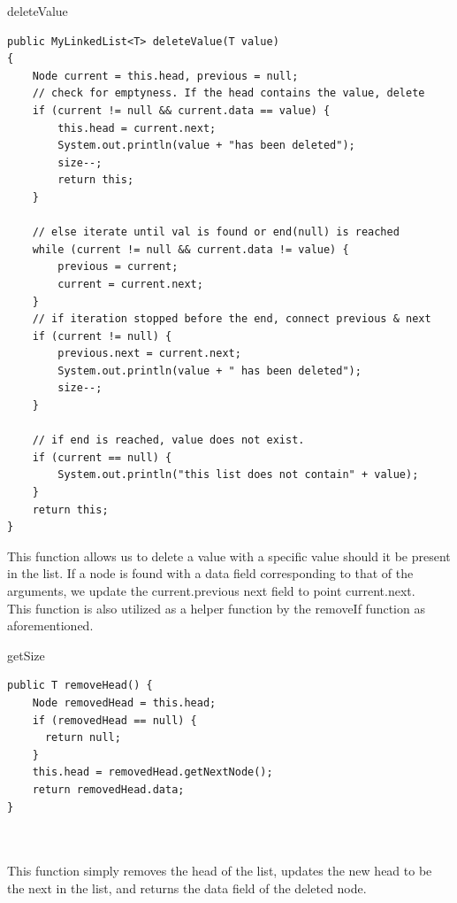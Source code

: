 \documentclass[a4paper]{article}
\begin{document}
\begin{algorithm}
\caption{deleteValue}\label{euclid}

\begin{verbatim}
public MyLinkedList<T> deleteValue(T value)
{
    Node current = this.head, previous = null;
    // check for emptyness. If the head contains the value, delete
    if (current != null && current.data == value) {
        this.head = current.next; 
        System.out.println(value + "has been deleted");
        size--;
        return this;
    }

    // else iterate until val is found or end(null) is reached
    while (current != null && current.data != value) {
        previous = current;
        current = current.next;
    }
    // if iteration stopped before the end, connect previous & next
    if (current != null) {
        previous.next = current.next;
        System.out.println(value + " has been deleted");
        size--;
    }
    
    // if end is reached, value does not exist. 
    if (current == null) {
        System.out.println("this list does not contain" + value);
    }
    return this;
}
\end{verbatim}
\end{algorithm}

This function allows us to delete a value with a specific value 
should it be present in the list. If a node is found with a 
data field corresponding to that of the arguments, we update 
the current.previous next field to point current.next. \\

This function is also utilized as a helper function by the removeIf
function as aforementioned.

\newpage


\begin{algorithm}
\caption{getSize}\label{euclid}

\begin{verbatim}
public T removeHead() {
    Node removedHead = this.head;
    if (removedHead == null) {
      return null;
    }
    this.head = removedHead.getNextNode();
    return removedHead.data;
}



\end{verbatim}
\end{algorithm}

This function simply removes the head of the list, 
updates the new head to be the next in the list, 
and returns the data field of the deleted node. \\
\end{document}
